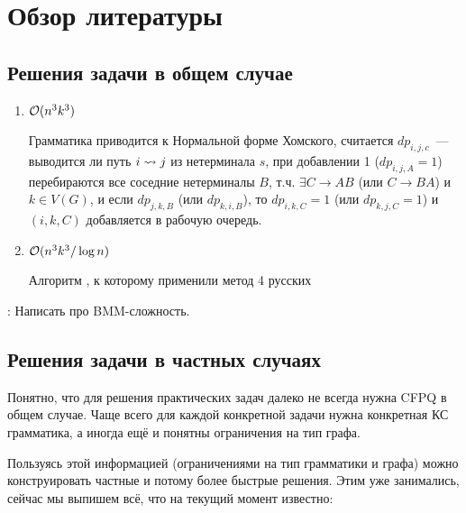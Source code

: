 \section{Обзор литературы}

\subsection{Решения задачи в общем случае}

\begin{enumerate}
    \item $\mathcal{O}(n^3 k^3)$ \cite{Reps97}

    Грамматика приводится к Нормальной форме Хомского, считается $dp_{i,j,c}$~--- выводится ли путь $i \rightsquigarrow j$ из нетерминала $s$, при добавлении 1 ($dp_{i,j,A} = 1$) перебираются все соседние нетерминалы $B$, т.ч. $\exists C \to AB$ (или $C \to BA$) и $k \in V(G)$, и если $dp_{j, k, B}$ (или $dp_{k, i, B}$), то $dp_{i, k, C} = 1$ (или $dp_{k, j, C} = 1$) и $(i, k, C)$ добавляется в рабочую очередь.

    \item $\mathcal{O}(n^3 k^3 / \log n)$ \cite{Chaudhuri08}

    Алгоритм \cite{Reps97}, к которому применили метод 4 русских

\end{enumerate}

\TODO: Написать про BMM-сложность.

\subsection{Решения задачи в частных случаях}

Понятно, что для решения практических задач далеко не всегда нужна CFPQ в общем случае. Чаще всего для каждой конкретной задачи нужна конкретная КС грамматика, а иногда ещё и понятны ограничения на тип графа.

Пользуясь этой информацией (ограничениями на тип грамматики и графа) можно конструировать частные и потому более быстрые решения. Этим уже занимались, сейчас мы выпишем всё, что на текущий момент известно:

